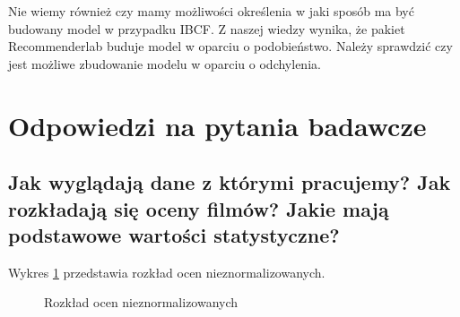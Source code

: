 \documentclass[12pt, a4paper]{article}
\begin{document}
Nie wiemy również czy mamy możliwości określenia w jaki sposób ma być budowany model w przypadku IBCF. Z naszej wiedzy wynika, że pakiet Recommenderlab buduje model w oparciu o podobieństwo. Należy sprawdzić czy jest możliwe zbudowanie modelu w oparciu o odchylenia.

\section{Odpowiedzi na pytania badawcze}

\subsection{Jak wyglądają dane z którymi pracujemy? Jak rozkładają się oceny filmów? Jakie mają podstawowe wartości statystyczne?}
Wykres \ref{fig:histogram-ocen-nieznorm} przedstawia rozkład ocen nieznormalizowanych. 

\begin{figure}[H]
  \begin{center}
  \end{center}
  \caption{Rozkład ocen nieznormalizowanych}
  \label{fig:histogram-ocen-nieznorm}
\end{figure}
\end{document}
